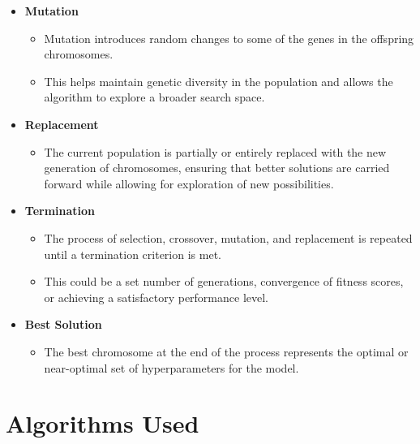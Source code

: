 \begin{itemize}
    \item \textbf{Mutation}
    \begin{itemize}
        \item Mutation introduces random changes to some of the genes in the offspring chromosomes.
        \item This helps maintain genetic diversity in the population and allows the algorithm to explore a broader search space.
    \end{itemize}

    \item \textbf{Replacement}
    \begin{itemize}
        \item The current population is partially or entirely replaced with the new generation of chromosomes, ensuring that better solutions are carried forward while allowing for exploration of new possibilities.
    \end{itemize}

    \item \textbf{Termination}
    \begin{itemize}
        \item The process of selection, crossover, mutation, and replacement is repeated until a termination criterion is met.
        \item This could be a set number of generations, convergence of fitness scores, or achieving a satisfactory performance level.
    \end{itemize}

    \item \textbf{Best Solution}
    \begin{itemize}
        \item The best chromosome at the end of the process represents the optimal or near-optimal set of hyperparameters for the model.
    \end{itemize}
\end{itemize}
\newpage

\section{Algorithms Used}

